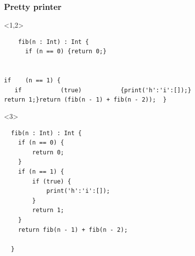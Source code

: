 \documentclass{beamer}
\begin{document}
\begin{frame}[fragile]
  \frametitle{Pretty printer}

  \begin{onlyenv}<1,2>
  \begin{verbatim}
    fib(n : Int) : Int {
      if (n == 0) {return 0;}


if    (n == 1) {
   if           (true)           {print('h':'i':[]);}
return 1;}return (fib(n - 1) + fib(n - 2));  }
    \end{verbatim}
  \end{onlyenv}

\begin{onlyenv}<3>
  \begin{verbatim}
  fib(n : Int) : Int {
    if (n == 0) {
        return 0;
    }
    if (n == 1) {
        if (true) {
            print('h':'i':[]);
        }
        return 1;
    }
    return fib(n - 1) + fib(n - 2);

  }
    \end{verbatim}
  \end{onlyenv}
\end{frame}
\end{document}
